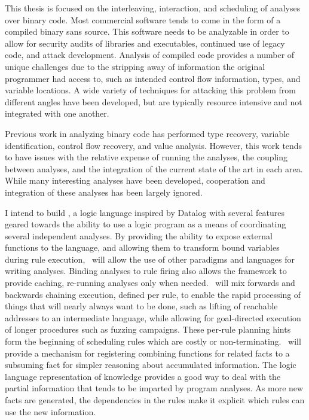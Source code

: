 This thesis is focused on the interleaving, interaction, and scheduling of analyses over binary code.
Most commercial software tends to come in the form of a compiled binary sans source.
This software needs to be analyzable in order to allow for security audits of libraries and executables, continued use of legacy code, and attack development.
Analysis of compiled code provides a number of unique challenges due to the stripping away of information the original programmer had access to, such as intended control flow information, types, and variable locations.
A wide variety of techniques for attacking this problem from different angles have been developed, but are typically resource intensive and not integrated with one another.

Previous work in analyzing binary code has performed type recovery\cite{bitr}, variable identification\cite{divine}, control flow recovery\cite{jakstab,phoenix}, and value analysis\cite{vsa}.
However, this work tends to have issues with the relative expense of running the analyses, the coupling between analyses, and the integration of the current state of the art in each area.
While many interesting analyses have been developed, cooperation and integration of these analyses has been largely ignored.

I intend to build \sysname, a logic language inspired by Datalog with several features geared towards the ability to use a logic program as a means of coordinating several independent analyses.
By providing the ability to expose external functions to the language, and allowing them to transform bound variables during rule execution, \sysname\ will allow the use of other paradigms and languages for writing analyses.
Binding analyses to rule firing also allows the framework to provide caching, re-running analyses only when needed.
\sysname\ will mix forwards and backwards chaining execution, defined per rule, to enable the rapid processing of things that will nearly always want to be done, such as lifting of reachable addresses to an intermediate language, while allowing for goal-directed execution of longer procedures such as fuzzing campaigns.
These per-rule planning hints form the beginning of scheduling rules which are costly or non-terminating.
\sysname\ will provide a mechanism for registering combining functions for related facts to a subsuming fact for simpler reasoning about accumulated information.
The logic language representation of knowledge provides a good way to deal with the partial information that tends to be imparted by program analyses. As more new facts are generated, the dependencies in the rules make it explicit which rules can use the new information.

